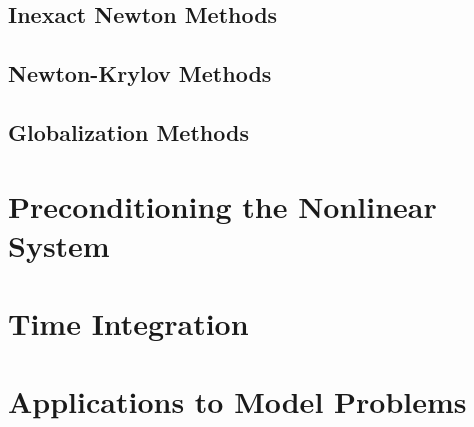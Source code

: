 \subsection{Inexact Newton Methods}
\label{subsec:newton_methods}

\subsection{Newton-Krylov Methods}
\label{subsec:newton_krylov_methods}

\subsection{Globalization Methods}
\label{subsec:globalization_methods}

\section{Preconditioning the Nonlinear System}
\label{sec:nonlinear_preconditioning}

\section{Time Integration}
\label{sec:time_integration}

\section{Applications to Model Problems}
\label{sec:nonlinear_applications}
